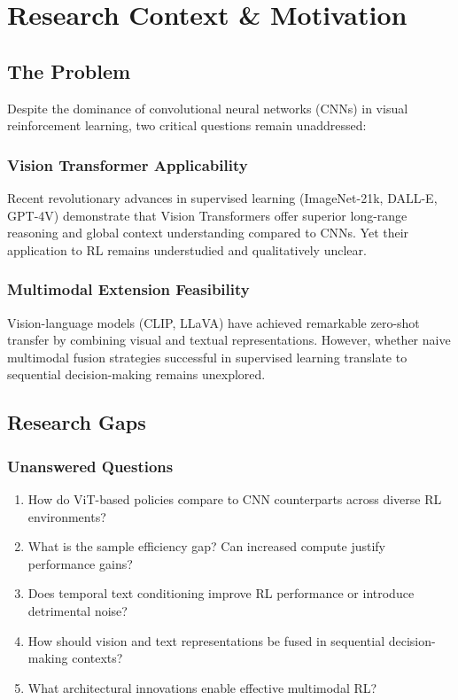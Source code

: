 \documentclass[12pt,a4paper,openany]{report}
\begin{document}
\chapter{Research Context \& Motivation}

\section{The Problem}

Despite the dominance of convolutional neural networks (CNNs) in visual reinforcement learning, two critical questions remain unaddressed:

\subsection{Vision Transformer Applicability}

Recent revolutionary advances in supervised learning (ImageNet-21k, DALL-E, GPT-4V) demonstrate that Vision Transformers offer superior long-range reasoning and global context understanding compared to CNNs. Yet their application to RL remains understudied and qualitatively unclear.

\subsection{Multimodal Extension Feasibility}

Vision-language models (CLIP, LLaVA) have achieved remarkable zero-shot transfer by combining visual and textual representations. However, whether naive multimodal fusion strategies successful in supervised learning translate to sequential decision-making remains unexplored.

\section{Research Gaps}

\subsection{Unanswered Questions}

\begin{enumerate}
    \item How do ViT-based policies compare to CNN counterparts across diverse RL environments?
    \item What is the sample efficiency gap? Can increased compute justify performance gains?
    \item Does temporal text conditioning improve RL performance or introduce detrimental noise?
    \item How should vision and text representations be fused in sequential decision-making contexts?
    \item What architectural innovations enable effective multimodal RL?
\end{enumerate}
\end{document}
